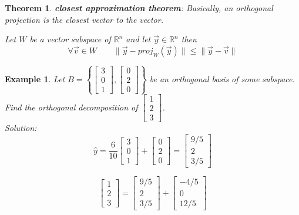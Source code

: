 \documentclass[11pt]{article}
\newtheorem{thm}{Theorem}
\newtheorem{ex}{Example}
\begin{document}
\begin{thm}
  \textbf{closest approximation theorem}: Basically, an orthogonal projection is the closest vector to the vector.

  Let $W$ be a vector subspace of $\mathbb{R}^{n}$ and let $\vec{y} \in \mathbb{R}^{n}$ then
  \[\forall \vec{v} \in W \qquad \| \vec{y} - proj_{W}(\vec{y}) \| \le \| \vec{y} - \vec{v} \|\]
\end{thm}


\begin{ex}
  Let $B = \left\{\begin{bmatrix} 3 \\ 0 \\ 1 \end{bmatrix}, \begin{bmatrix} 0 \\ 2 \\ 0 \end{bmatrix} \right\}$ be an orthogonal basis of some subspace.
  Find the orthogonal decomposition of $\begin{bmatrix} 1 \\ 2 \\ 3 \end{bmatrix}$.\\
  Solution: \\

  \[\hat{y} = \frac{6}{10}\begin{bmatrix} 3 \\ 0 \\ 1 \end{bmatrix} + \begin{bmatrix} 0 \\ 2 \\ 0 \end{bmatrix} = \begin{bmatrix} 9/5 \\ 2 \\ 3/5 \end{bmatrix}\]

  \[\begin{bmatrix} 1 \\ 2\\ 3 \end{bmatrix} = \begin{bmatrix} 9/5 \\ 2 \\ 3/5 \end{bmatrix} + \begin{bmatrix} -4/5 \\ 0 \\ 12/5 \end{bmatrix}\]
\end{ex}
\end{document}
